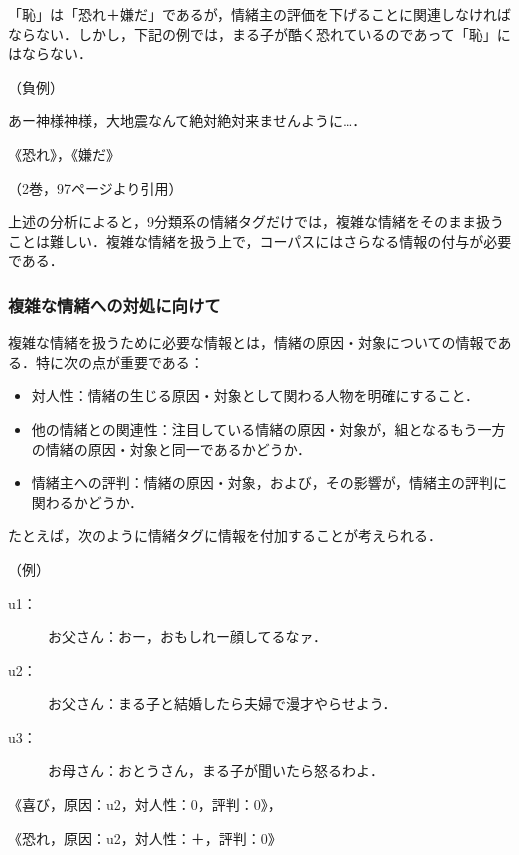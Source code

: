 \documentclass[japanese]{jnlp_1.3c}
\begin{document}
\begin{itemize}
\item 「恥」は「恐れ＋嫌だ」であるが，情緒主の評価を下げることに関連しなければならない．しかし，下記の例では，まる子が酷く恐れているのであって「恥」にはならない．
  \begin{description}
  \item （負例）
    \begin{description}
    \item [まる子：] あー神様神様，大地震なんて絶対絶対来ませんように…．
    \item 《恐れ》，《嫌だ》
    \end{description}
    \begin{flushright}
    （2巻，97ページより引用）
    \end{flushright}
  \end{description}
\end{itemize}

上述の分析によると，9分類系の情緒タグだけでは，複雑な情緒をそのまま扱うことは難しい．複雑な情緒を扱う上で，コーパスにはさらなる情報の付与が必要である．

\subsubsection{複雑な情緒への対処に向けて}

複雑な情緒を扱うために必要な情報とは，情緒の原因・対象についての情報である．特に次の点が重要である：
\begin{itemize}
\item 対人性：情緒の生じる原因・対象として関わる人物を明確にすること．
\item 他の情緒との関連性：注目している情緒の原因・対象が，組となるもう一方の情緒の原因・対象と同一であるかどうか．
\item 情緒主への評判：情緒の原因・対象，および，その影響が，情緒主の評判に関わるかどうか．
\end{itemize}

たとえば，次のように情緒タグに情報を付加することが考えられる．
\begin{description}
\item （例）
  \begin{description}
  \item [u1：] お父さん：おー，おもしれー顔してるなァ．
  \item [u2：] お父さん：まる子と結婚したら夫婦で漫才やらせよう．
  \item [u3：] お母さん：おとうさん，まる子が聞いたら怒るわよ．
  \end{description}
  \begin{description}
  \item 《喜び，原因：u2，対人性：0，評判：0》，
  \item 《恐れ，原因：u2，対人性：＋，評判：0》
  \end{description}
\end{description}
\end{document}
